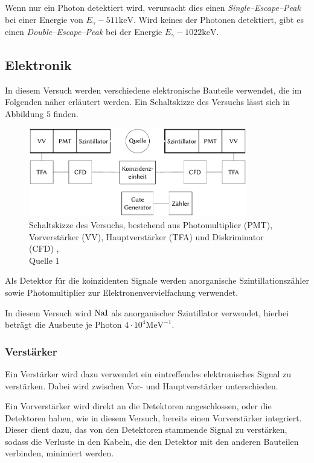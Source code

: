 \documentclass[12pt,a4paper]{scrartcl}
\numberwithin{equation}{section} %
\newcommand{\pu}[1]{\ensuremath{\mathrm{#1}}}
\renewcommand{\[}{} %
\renewcommand{\]}{\noindent} %
\begin{document}
Wenn nur ein Photon detektiert wird, verursacht dies einen
\emph{Single--Escape--Peak} bei einer Energie von
\(E_\gamma - \pu{511 keV}\). Wird keines der Photonen detektiert, gibt
es einen \emph{Double--Escape--Peak} bei der Energie
\(E_\gamma - \pu{1022 keV}\).

\hypertarget{elektronik}{%
\subsection{Elektronik}\label{elektronik}}

In diesem Versuch werden verschiedene elektronische Bauteile verwendet,
die im Folgenden näher erläutert werden. Ein Schaltskizze des Versuchs
lässt sich in Abbildung \(5\) finden.

\begin{figure}
	\centering
	\includegraphics[width=0.85\textwidth]{../media/B3.4/Schaltplan.pdf}
	\caption{Schaltskizze des Versuchs, bestehend aus
		Photomultiplier (PMT), Vorverstärker (VV),
		Hauptverstärker (TFA) und Diskriminator (CFD) ,\\
		Quelle \(1\)}
	\label{abb:Schaltplan}
\end{figure}

Als Detektor für die koinzidenten Signale werden anorganische
Szintillationszähler sowie Photomultiplier zur Elektronenvervielfachung
verwendet.

In diesem Versuch wird \(\ce{NaI}\) als anorganischer Szintillator
verwendet, hierbei beträgt die Ausbeute je Photon
\(\pu{4\cdot 10^{4} MeV^{-1}}\).

\hypertarget{verstuxe4rker}{%
\subsubsection{Verstärker}\label{verstuxe4rker}}

Ein Verstärker wird dazu verwendet ein eintreffendes elektronisches
Signal zu verstärken. Dabei wird zwischen Vor- und Hauptverstärker
unterschieden.

Ein Vorverstärker wird direkt an die Detektoren angeschlossen, oder die
Detektoren haben, wie in diesem Versuch, bereits einen Vorverstärker
integriert. Dieser dient dazu, das von den Detektoren stammende Signal
zu verstärken, sodass die Verluste in den Kabeln, die den Detektor mit
den anderen Bauteilen verbinden, minimiert werden.
\end{document}
